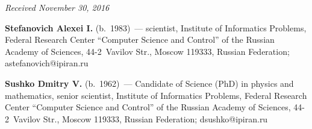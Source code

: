\vspace*{-3pt}

\hfill{\small\textit{Received November 30, 2016}}


\Contr

\noindent
\textbf{Stefanovich Alexei I.} (b.\ 1983)~---
scientist, Institute of Informatics Problems, Federal Research Center 
``Computer Science and Control'' of the Russian Academy of Sciences, 44-2~Vavilov
Str., Moscow 119333, Russian Federation; \mbox{astefanovich@ipiran.ru} 

\vspace*{3pt}

\noindent
\textbf{Sushko Dmitry V.} (b.\ 1962)~---
Candidate of Science (PhD) in physics and mathematics, senior scientist, Institute 
of Informatics Problems, Federal Research Center ``Computer Science
and Control'' of the Russian Academy of Sciences, 44-2~Vavilov Str., Moscow 119333, 
Russian Federation; \mbox{dsushko@ipiran.ru} 
\label{end\stat}


\renewcommand{\bibname}{\protect\rm Литература} 